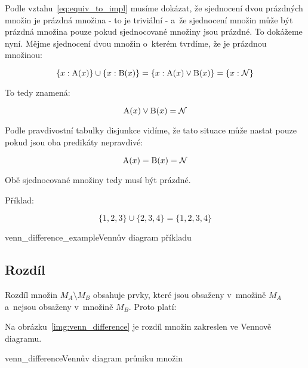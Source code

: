Podle vztahu~\eqref{eq:equiv_to_impl} musíme dokázat, že sjednocení dvou prázdných množin je prázdná množina - to je triviální - a~že sjednocení množin může být prázdná množina pouze pokud sjednocované množiny jsou prázdné. To dokážeme nyní. Mějme sjednocení dvou množin o~kterém tvrdíme, že je prázdnou množinou:

\begin{equation}
\{x: \mathrm{A}(x)\} \cup \{x: \mathrm{B}(x)\} = \{x: \mathrm{A}(x) \lor \mathrm{B}(x)\} = \{x: \mathcal{N}\}
\end{equation}

To tedy znamená:

\begin{equation}
\mathrm{A}(x) \lor \mathrm{B}(x) = \mathcal{N}
\end{equation}

Podle pravdivostní tabulky disjunkce vidíme, že tato situace může nastat pouze pokud jsou oba predikáty nepravdivé:

\begin{equation}
\mathrm{A}(x) = \mathrm{B}(x) = \mathcal{N}
\end{equation}

Obě sjednocované množiny tedy musí být prázdné.

Příklad:

\begin{equation}
\{1, 2, 3\} \cup \{2, 3, 4\} = \{1, 2, 3, 4\}
\end{equation}

\begin{fig}{venn_difference_example}{Vennův diagram příkladu}
\end{fig}

\subsection{Rozdíl}

Rozdíl množin \(M_A \setminus M_B\) obsahuje prvky, které jsou obsaženy v~množině \(M_A\) a~nejsou obsaženy v~množině \(M_B\). Proto platí:


Na obrázku~\ref{img:venn_difference} je rozdíl množin zakreslen ve Vennově diagramu.

\begin{fig}{venn_difference}{Vennův diagram průniku množin}
\end{fig}

